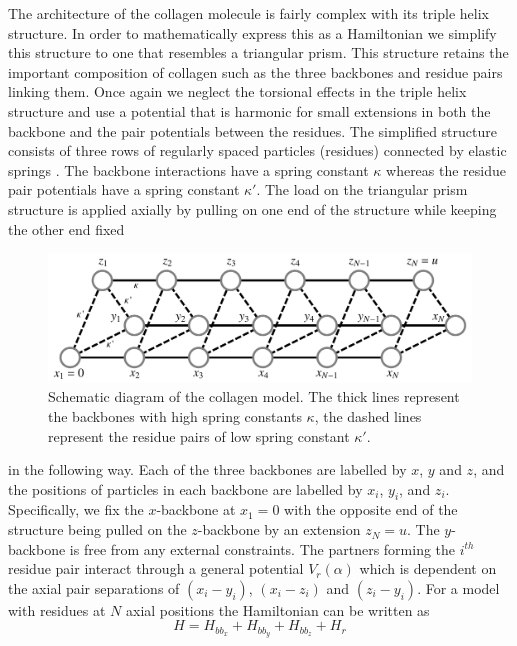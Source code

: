 The architecture of the collagen molecule is fairly complex with its triple helix structure. In order to mathematically express this as a Hamiltonian we simplify this structure to one that resembles a triangular prism. This structure retains the important composition of collagen such as the three backbones and residue pairs linking them. Once again we neglect the torsional effects in the triple helix structure and use a potential that is harmonic for small extensions in both the backbone and the pair potentials between the residues. The simplified structure consists of three rows of regularly spaced particles (residues) connected by elastic springs . The backbone interactions have a spring constant $\kappa$ whereas the residue pair potentials have a spring constant $\kappa'$. The load on the triangular prism structure is applied axially by pulling on one end of the structure while keeping the other end fixed
%
\begin{figure}
\centering \includegraphics[scale=0.35]{Graphics/Collagen_Model/collagen_structure.pdf}
\caption{Schematic diagram of the collagen model. The thick lines represent the backbones with high spring constants $\kappa$, the dashed lines represent the residue pairs of low spring constant $\kappa'$.}
\label{fig:collagen_model_tri_prism}
\end{figure}
%
in the following way. Each of the three backbones are labelled by $x$, $y$ and $z$, and the positions of particles in each backbone are labelled by $x_i$, $y_i$, and $z_i$. Specifically, we fix the $x$-backbone at $x_{1}=0$ with the opposite end of the structure being pulled on the $z$-backbone by an extension $z_N=u$. The $y$-backbone is free from any external constraints. The partners forming the $i^{th}$ residue pair interact through a general potential $V_{r}\left(\alpha\right)$ which is dependent on the axial pair separations of $(x_{i}-y_{i})$, $(x_{i}-z_{i})$ and $(z_{i}-y_{i})$. For a model with residues at $N$ axial positions the Hamiltonian can be written as 
%
\begin{equation}
\label{collagen_hamiltonian}
H = H_{bb_x} + H_{bb_y} + H_{bb_z}+H_{r}
\end{equation}
